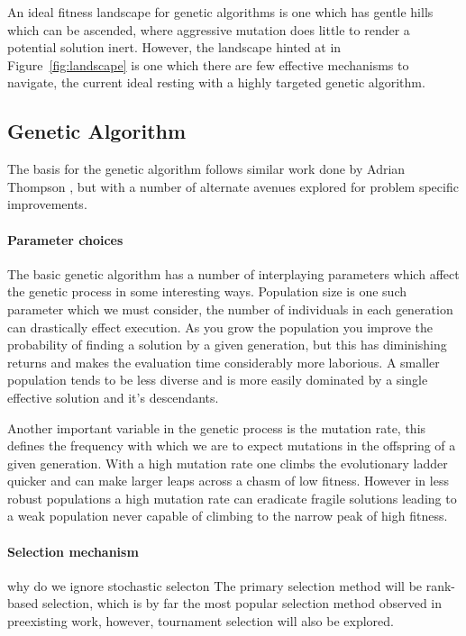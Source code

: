 An ideal fitness landscape for genetic algorithms is one which has gentle hills
which can be ascended, where aggressive mutation does little to render a potential
solution inert. However, the landscape hinted at in Figure~\ref{fig:landscape} is
one which there are few effective mechanisms to navigate, the current ideal resting
with a highly targeted genetic algorithm.

\subsection{Genetic Algorithm}

The basis for the genetic algorithm follows similar work done by Adrian Thompson
\cite{10.1007/3-540-63173-9_61}, but with a number of alternate avenues explored
for problem specific improvements.

\paragraph{Parameter choices}
The basic genetic algorithm has a number of interplaying parameters which affect the genetic
process in some interesting ways. Population size is one such parameter which we must consider,
the number of individuals in each generation can drastically effect execution. As you grow the
population you improve the probability of finding a solution by a given generation, but this has
diminishing returns and makes the evaluation time considerably more laborious. A smaller population
tends to be less diverse and is more easily dominated by a single effective solution
and it's descendants.

Another important variable in the genetic process is the mutation rate, this defines the
frequency with which we are to expect mutations in the offspring of a given generation.
With a high mutation rate one climbs the evolutionary ladder quicker and can make larger
leaps across a chasm of low fitness. However in less robust populations a high mutation rate
can eradicate fragile solutions leading to a weak population never capable of
climbing to the narrow peak of high fitness.

\paragraph{Selection mechanism}
\todo why do we ignore stochastic selecton
The primary selection method will be rank-based selection, which is by far
the most popular selection method observed in preexisting work, however,
tournament selection will also be explored.

